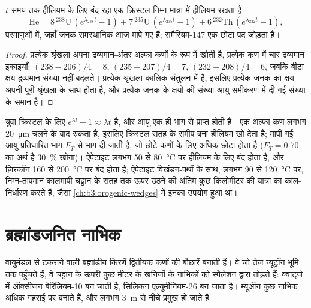 \begin{theorem}[हीलियम संचय]\label{thm:b3:advanced-geochronology:helium}
$t$ समय तक हीलियम के लिए बंद रहा एक क्रिस्टल निम्न मात्रा में हीलियम रखता है
\[
\mathrm{He} = 8\,{}^{238}\mathrm U\,(e^{\lambda_{238}t} - 1)
+ 7\,{}^{235}\mathrm U\,(e^{\lambda_{235}t} - 1)
+ 6\,{}^{232}\mathrm{Th}\,(e^{\lambda_{232}t} - 1),
\]
परमाणुओं में, जहाँ जनक समस्थानिक आज मापे गए हैं; समैरियम-147 एक छोटा पद जोड़ता है।
\end{theorem}

\begin{proof}
प्रत्येक श्रृंखला अपना द्रव्यमान-अंतर अल्फा कणों के रूप में खोती है, प्रत्येक कण में चार द्रव्यमान इकाइयाँ:
$(238 - 206)/4 = 8$, $(235 - 207)/4 = 7$, $(232 - 208)/4 = 6$, जबकि बीटा
क्षय द्रव्यमान संख्या नहीं बदलते। प्रत्येक श्रृंखला कालिक संतुलन में है,
इसलिए प्रत्येक जनक का क्षय अपनी पूरी श्रृंखला के साथ होता है, और प्रत्येक जनक के
क्षयों की संख्या आयु समीकरण में दी गई संख्या के समान है।
\end{proof}

युवा क्रिस्टल के लिए $e^{\lambda t} - 1 \approx \lambda t$ है, और आयु
एक ही भाग से प्राप्त होती है। एक अल्फा कण लगभग
\qty{20}{\micro\metre} चलने के बाद रुकता है, इसलिए क्रिस्टल सतह के समीप बना हीलियम
खो देता है; मापी गई आयु प्रतिधारित भाग $F_T$ से भाग दी जाती है,
जो छोटे कणों के लिए अधिक छोटा होता है ($F_T = 0.70$ का अर्थ है \qty{30}{\percent}
खोना)। ऐपेटाइट लगभग 50 से \qty{80}{\celsius} पर हीलियम के लिए बंद होता है, और ज़िरकॉन
160 से \qty{200}{\celsius} पर बंद होता है; ऐपेटाइट विखंडन-पथों के साथ, लगभग 90 से
\qty{120}{\celsius} पर, निम्न-तापमान कालमापी चट्टान के सतह तक ऊपर उठने की अंतिम कुछ
किलोमीटर की यात्रा का काल-निर्धारण करते हैं, जैसा
\cref{ch:b3:orogenic-wedges} में इनका उपयोग हुआ था।

\section{ब्रह्मांडजनित नाभिक}\label{sec:b3:advanced-geochronology:cosmogenic}

वायुमंडल से टकराने वाली ब्रह्मांडीय किरणें द्वितीयक कणों की बौछारें बनाती हैं। वे
जो तेज़ न्यूट्रॉन भूमि तक पहुँचते हैं, वे चट्टान के ऊपरी
कुछ मीटर के खनिजों के नाभिकों को स्पैलेशन द्वारा तोड़ते हैं: क्वार्ट्ज़ में ऑक्सीजन बेरिलियम-10 बन जाती है, सिलिकन
एल्युमीनियम-26 बन जाता है। म्यूऑन कुछ नाभिक अधिक गहराई पर बनाते हैं, और लगभग
\qty{3}{m} से नीचे प्रमुख हो जाते हैं।

